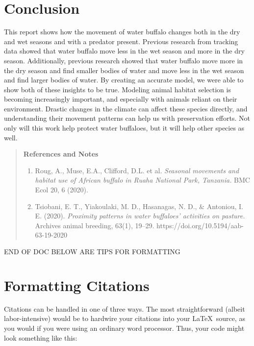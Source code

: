 \documentclass[12pt]{article}
\begin{document}
\section*{Conclusion}

This report shows how the movement of water buffalo changes both in the dry and wet seasons and with a predator present. Previous research from tracking data showed that water buffalo move less in the wet season and more in the dry season. Additionally, previous research showed that water buffalo move more in the dry season and find smaller bodies of water and move less in the wet season and find larger bodies of water. By creating an accurate model, we were able to show both of these insights to be true. Modeling animal habitat selection is becoming increasingly important, and especially with animals reliant on their environment. Drastic changes in the climate can affect these species directly, and understanding their movement patterns can help us with preservation efforts. Not only will this work help protect water buffaloes, but it will help other species as well.

\newpage

\begin{quote}
{\bf References and Notes}

\begin{enumerate}
\item Roug, A., Muse, E.A., Clifford, D.L. et al. {\it Seasonal movements and habitat use of African buffalo in Ruaha National Park, Tanzania.} BMC Ecol 20, 6 (2020).
\item Tsiobani, E. T., Yiakoulaki, M. D., Hasanagas, N. D., \& Antoniou, I. E. (2020). {\it Proximity patterns in water buffaloes' activities on pasture.} Archives animal breeding, 63(1), 19–29. https://doi.org/10.5194/aab-63-19-2020
\end{enumerate}
\end{quote}

END OF DOC BELOW ARE TIPS FOR FORMATTING

\section*{Formatting Citations}

Citations can be handled in one of three ways.  The most
straightforward (albeit labor-intensive) would be to hardwire your
citations into your \LaTeX\ source, as you would if you were using an
ordinary word processor.  Thus, your code might look something like
this:
\end{document}
